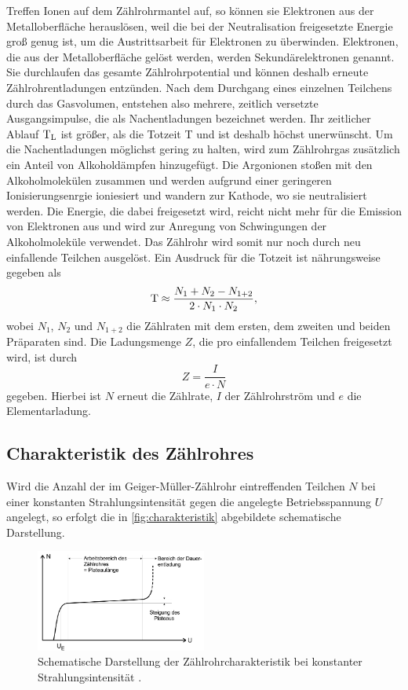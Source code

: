 Treffen Ionen auf dem Zählrohrmantel auf, so können sie Elektronen aus der Metalloberfläche herauslösen, weil die bei der Neutralisation freigesetzte Energie groß genug ist, um die Austrittsarbeit für Elektronen zu überwinden.
Elektronen, die aus der Metalloberfläche gelöst werden, werden Sekundärelektronen genannt. Sie durchlaufen das gesamte Zählrohrpotential und können deshalb erneute Zählrohrentladungen entzünden. Nach dem Durchgang eines einzelnen Teilchens 
durch das Gasvolumen, entstehen also mehrere, zeitlich versetzte Ausgangsimpulse, die als Nachentladungen bezeichnet werden. Ihr zeitlicher Ablauf $\text{T}_{\text L}$ ist größer, als die Totzeit T und ist deshalb höchst unerwünscht.
Um die Nachentladungen möglichst gering zu halten, wird zum Zählrohrgas zusätzlich ein Anteil von Alkoholdämpfen hinzugefügt. Die Argonionen stoßen mit den Alkoholmolekülen zusammen und werden aufgrund einer geringeren Ionisierungsenrgie ioniesiert und wandern zur Kathode, wo sie neutralisiert werden.
Die Energie, die dabei freigesetzt wird, reicht nicht mehr für die Emission von Elektronen aus und wird zur Anregung von Schwingungen der Alkoholmoleküle verwendet. Das Zählrohr wird somit nur noch durch neu einfallende Teilchen ausgelöst.
\newline
Ein Ausdruck für die Totzeit ist nährungsweise gegeben als
\begin{equation}
    \text T \approx \frac{N_1 + N_2 - N_\text{1+2}}{2 \cdot N_1 \cdot N_2},
    \label{eqn:tot}
\end{equation}
wobei $N_1$, $N_2$ und $N_{1+2}$ die Zählraten mit dem ersten, dem zweiten und beiden Präparaten sind.
Die Ladungsmenge $Z$, die pro einfallendem Teilchen freigesetzt wird, ist durch 
\begin{equation}
    Z = \frac{I}{e \cdot N}
    \label{eqn:ener}
\end{equation}
gegeben. Hierbei ist $N$ erneut die Zählrate, $I$ der Zählrohrström und $e$ die Elementarladung.


\subsection{Charakteristik des Zählrohres}
\label{subsec:ZaehlrohrCharakteristik}

Wird die Anzahl der im Geiger-Müller-Zählrohr eintreffenden Teilchen $N$ bei einer konstanten Strahlungsintensität gegen die angelegte Betriebsspannung $U$ angelegt, so erfolgt die in \autoref{fig:charakteristik} abgebildete schematische Darstellung.
\begin{figure}[H]
    \centering
    \includegraphics[width=0.5\textwidth]{data/charakteristik.png}
    \caption{Schematische Darstellung der Zählrohrcharakteristik bei konstanter Strahlungsintensität \cite{Anleitung703}.}
    \label{fig:charakteristik}
\end{figure}

